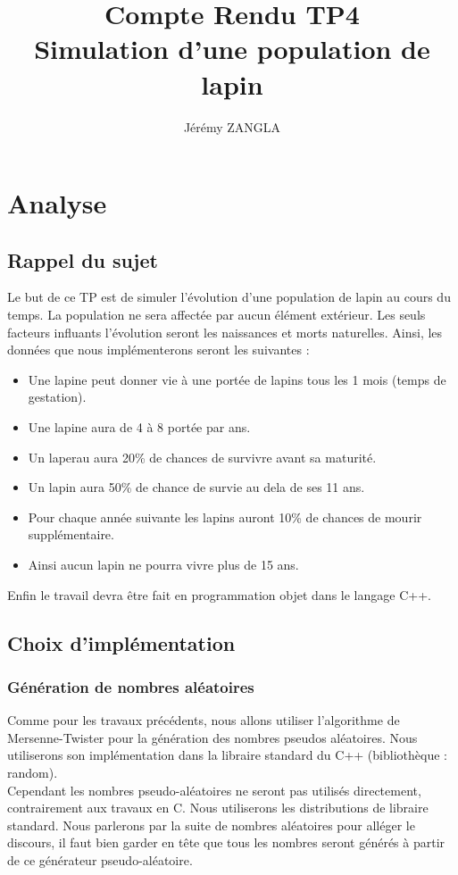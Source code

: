 \documentclass[11pt,a4paper]{article}
\title{Compte Rendu TP4\\Simulation d'une population de lapin}
\author{Jérémy ZANGLA}
\begin{document}
\maketitle
\pagebreak
\tableofcontents
\pagebreak

\section{Analyse}
    \subsection{Rappel du sujet}
        Le but de ce TP est de simuler l'évolution d'une population de lapin au cours du temps.
        La population ne sera affectée par aucun élément extérieur. Les seuls facteurs influants l'évolution seront les naissances et morts naturelles.
        Ainsi, les données que nous implémenterons seront les suivantes : 
        \begin{itemize}
            \item Une lapine peut donner vie à une portée de lapins tous les 1 mois (temps de gestation).
            \item Une lapine aura de 4 à 8 portée par ans.
            \item Un laperau aura 20\% de chances de survivre avant sa maturité.
            \item Un lapin aura 50\% de chance de survie au dela de ses 11 ans.
            \item Pour chaque année suivante les lapins auront 10\% de chances de mourir supplémentaire.
            \item Ainsi aucun lapin ne pourra vivre plus de 15 ans.
        \end{itemize}
        Enfin le travail devra être fait en programmation objet dans le langage C++.
    \subsection{Choix d'implémentation}
        \subsubsection{Génération de nombres aléatoires}
            Comme pour les travaux précédents, nous allons utiliser l'algorithme de Mersenne-Twister pour la génération des nombres pseudos aléatoires.
            Nous utiliserons son implémentation dans la libraire standard du C++ (bibliothèque : random). 
            \\
            Cependant les nombres pseudo-aléatoires ne seront pas utilisés directement, contrairement aux travaux en C. Nous utiliserons les distributions de libraire standard.
            Nous parlerons par la suite de nombres aléatoires pour alléger le discours, il faut bien garder en tête que tous les nombres seront générés à partir de ce générateur pseudo-aléatoire.
\end{document}
